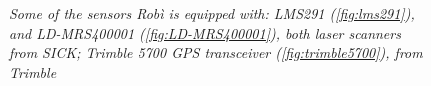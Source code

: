 \begin{description}


\begin{figure}
	\centering
	\qquad
	\caption{\textit{Some of the sensors Robì is equipped with: LMS291 (\ref{fig:lms291}), and LD-MRS400001 (\ref{fig:LD-MRS400001}), both laser scanners from SICK; Trimble 5700 GPS transceiver (\ref{fig:trimble5700}), from Trimble}}
\end{figure}


\end{description}
